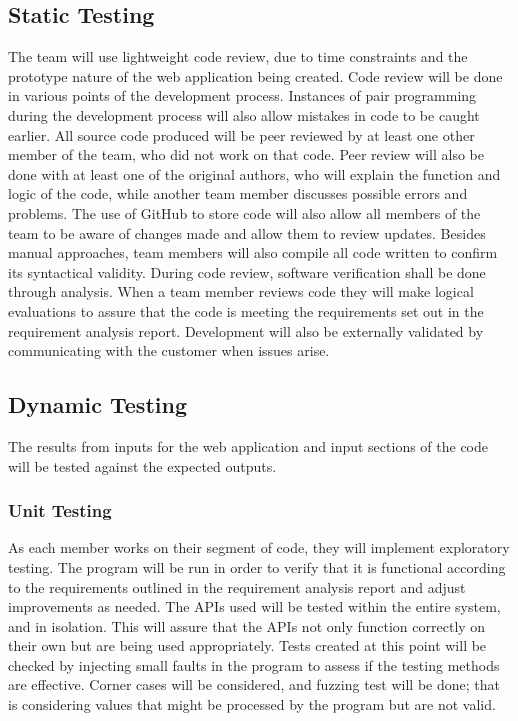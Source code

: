 \documentclass[]{IEEEtran}
\begin{document}
	\subsection{Static Testing}
	The team will use lightweight code review, due to time constraints and the prototype nature of the web application being created. Code review will be done in various points of the development process. Instances of pair programming during the development process will also allow mistakes in code to be caught earlier.  All source code produced will be peer reviewed by at least one other member of the team, who did not work on that code. Peer review will also be done with at least one of the original authors, who will explain the function and logic of the code, while another team member discusses possible errors and problems. The use of GitHub to store code will also allow all members of the team to be aware of changes made and allow them to review updates. Besides manual approaches, team members will also compile all code written to confirm its syntactical validity.
During code review, software verification shall be done through analysis. When a team member reviews code they will make logical evaluations to assure that the code is meeting the requirements set out in the requirement analysis report.
Development will also be externally validated by communicating with the customer when issues arise.

	\subsection{Dynamic Testing}
	The results from inputs for the web application and input sections of the code will be tested against the expected outputs.
	
	\subsubsection{Unit Testing}
	As each member works on their segment of code, they will implement exploratory testing. The program will be run in order to verify that it is functional according to the requirements outlined in the requirement analysis report and adjust improvements as needed. The APIs used will be tested within the entire system, and in isolation. This will assure that the APIs not only function correctly on their own but are being used appropriately. Tests created at this point will be checked by injecting small faults in the program to assess if the testing methods are effective. Corner cases will be considered, and fuzzing test will be done; that is considering values that might be processed by the program but are not valid.
	
\end{document}
